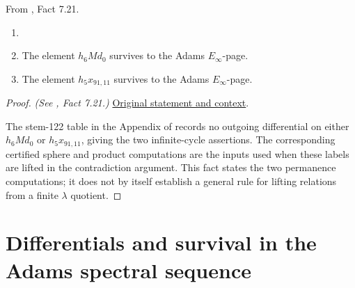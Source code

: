 \begin{fact}
\label{paper:7.21}
From \cite{LWX126}, Fact 7.21.\par
\label{fact:stem122}
\begin{enumerate}
    \item[] 
    \item The element $h_6 M d_0$ survives to the Adams $E_\infty$-page.
    \item The element $h_5x_{91,11}$ survives to the Adams $E_\infty$-page.
\end{enumerate}



\end{fact}
\begin{proof}
\textit{(See \cite{LWX126}, Fact 7.21.)} \href{paper/main.tex.html#L2689}{Original statement and context}.

The stem-122 table in the Appendix of \cite{LWX126} records no outgoing differential on either $h_6Md_0$ or $h_5x_{91,11}$, giving the two infinite-cycle assertions. The corresponding certified sphere and product computations are the inputs used when these labels are lifted in the contradiction argument. This fact states the two permanence computations; it does not by itself establish a general rule for lifting relations from a finite $\lambda$ quotient.
\end{proof}

\section{Differentials and survival in the Adams spectral sequence}
